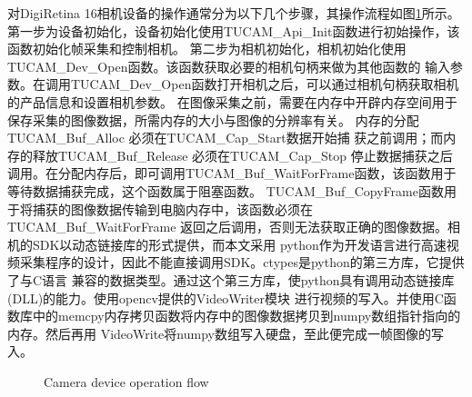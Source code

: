 	对DigiRetina 16相机设备的操作通常分为以下几个步骤，其操作流程如图\ref{fig:flow_chart1}所示。
	第一步为设备初始化，设备初始化使用TUCAM\_Api\_Init函数进行初始操作，该函数初始化帧采集和控制相机。
	第二步为相机初始化，相机初始化使用TUCAM\_Dev\_Open函数。该函数获取必要的相机句柄来做为其他函数的
	输入参数。在调用TUCAM\_Dev\_Open函数打开相机之后，可以通过相机句柄获取相机的产品信息和设置相机参数。
	在图像采集之前，需要在内存中开辟内存空间用于保存采集的图像数据，所需内存的大小与图像的分辨率有关。
	内存的分配TUCAM\_Buf\_Alloc 必须在TUCAM\_Cap\_Start数据开始捕
	获之前调用；而内存的释放TUCAM\_Buf\_Release 必须在TUCAM\_Cap\_Stop 停止数据捕获之后
	调用。在分配内存后，即可调用TUCAM\_Buf\_WaitForFrame函数，该函数用于等待数据捕获完成，这个函数属于阻塞函数。
	TUCAM\_Buf\_CopyFrame函数用于将捕获的图像数据传输到电脑内存中，该函数必须在
	TUCAM\_Buf\_WaitForFrame 返回之后调用，否则无法获取正确的图像数据。相机的SDK以动态链接库的形式提供，而本文采用
	python作为开发语言进行高速视频采集程序的设计，因此不能直接调用SDK。ctypes是python的第三方库，它提供了与C语言
	兼容的数据类型。通过这个第三方库，使python具有调用动态链接库(DLL)的能力。使用opencv提供的VideoWriter模块
	进行视频的写入。并使用C函数库中的memcpy内存拷贝函数将内存中的图像数据拷贝到numpy数组指针指向的内存。然后再用
	VideoWrite将numpy数组写入硬盘，至此便完成一帧图像的写入。
	\begin{figure}[!htp]
    \centering
	{Camera device operation flow}
    \label{fig:flow_chart1}
	\end{figure}
